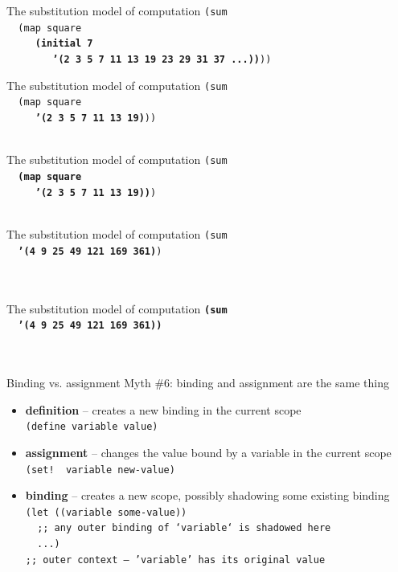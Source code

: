 \documentclass{beamer}
\begin{document}
\begin{frame}{The substitution model of computation}
  \texttt{(sum \\
    \ \ (map square \\
    \ \ \ \ \ \textbf{(initial 7\\
    \ \ \ \ \ \ \ \ '(2 3 5 7 11 13 19 23 29 31 37 ...))}))}
\end{frame}

\begin{frame}{The substitution model of computation}
  \texttt{(sum \\
    \ \ (map square \\
    \ \ \ \ \ \textbf{'(2 3 5 7 11 13 19)}))\\
    \ }
\end{frame}

\begin{frame}{The substitution model of computation}
  \texttt{(sum \\
    \ \ \textbf{(map square \\
    \ \ \ \ \ '(2 3 5 7 11 13 19))})\\
    \ }
\end{frame}

\begin{frame}{The substitution model of computation}
  \texttt{(sum \\
    \ \ \textbf{'(4 9 25 49 121 169 361)})\\
    \ \\
    \ }
\end{frame}

\begin{frame}{The substitution model of computation}
  \texttt{\textbf{(sum \\
    \ \ '(4 9 25 49 121 169 361))}\\
    \ \\
    \ }
\end{frame}

\begin{frame}{Binding vs. assignment} \pause
  Myth \#6: binding and assignment are the same thing \\ \pause
  \begin{itemize}
  \item \textbf{definition} -- creates a new binding in the
    current scope \\ \pause
    \texttt{(define variable value)}\pause
  \item \textbf{assignment} -- changes the value bound by
    a variable in the current scope \\ \pause
    \texttt{(set!\,\,variable new-value)} \pause
  \item \textbf{binding} -- creates a new scope,
    possibly shadowing some existing binding \\ \pause
    \texttt{(let ((variable some-value)) \\
      \ \ {\scriptsize ;; any outer binding of `variable` is shadowed here} \\
      \ \ ...) \\ \pause
      {\scriptsize ;; outer context -- 'variable' has its original value}
      }
  \end{itemize}
\end{frame}
\end{document}
